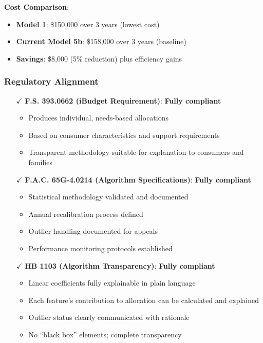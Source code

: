 \textbf{Cost Comparison}:
\begin{itemize}
    \item \textbf{Model 1}: \$150,000 over 3 years (lowest cost)
    \item \textbf{Current Model 5b}: \$158,000 over 3 years (baseline)
    \item \textbf{Savings}: \$8,000 (5\% reduction) plus efficiency gains
\end{itemize}

\subsubsection{Regulatory Alignment}

\begin{itemize}
    \item[$\checkmark$] \textbf{F.S. 393.0662 (iBudget Requirement)}: \textbf{Fully compliant}
    \begin{itemize}
        \item Produces individual, needs-based allocations
        \item Based on consumer characteristics and support requirements
        \item Transparent methodology suitable for explanation to consumers and families
    \end{itemize}
    
    \item[$\checkmark$] \textbf{F.A.C. 65G-4.0214 (Algorithm Specifications)}: \textbf{Fully compliant}
    \begin{itemize}
        \item Statistical methodology validated and documented
        \item Annual recalibration process defined
        \item Outlier handling documented for appeals
        \item Performance monitoring protocols established
    \end{itemize}
    
    \item[$\checkmark$] \textbf{HB 1103 (Algorithm Transparency)}: \textbf{Fully compliant}
    \begin{itemize}
        \item Linear coefficients fully explainable in plain language
        \item Each feature's contribution to allocation can be calculated and explained
        \item Outlier status clearly communicated with rationale
        \item No ``black box'' elements; complete transparency
    \end{itemize}
    

\end{itemize}
